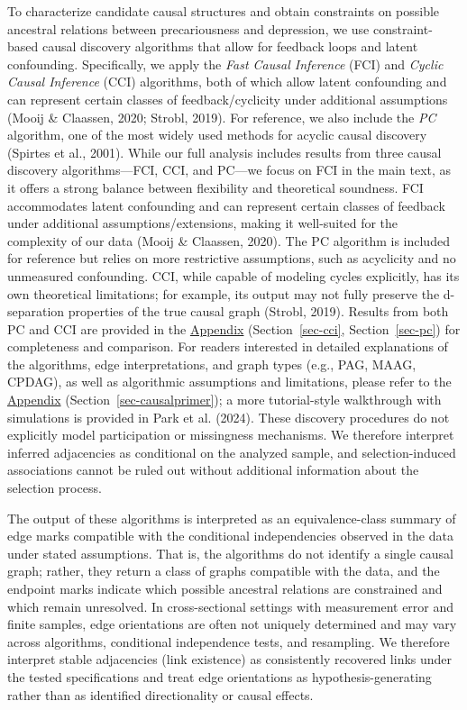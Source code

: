 \documentclass[
]{article}
\begin{document}
\textcolor{BrickRed}{To characterize candidate causal structures and obtain constraints on possible ancestral relations between precariousness and depression, we use constraint-based causal discovery algorithms that allow for feedback loops and latent confounding.}
Specifically, we apply the \emph{Fast Causal Inference} (FCI) and
\emph{Cyclic Causal Inference} (CCI) algorithms,
\textcolor{BrickRed}{both of which allow latent confounding and can represent certain classes of feedback/cyclicity under additional assumptions}
(Mooij \& Claassen, 2020; Strobl, 2019). For reference, we also include
the \emph{PC} algorithm, one of the most widely used methods for acyclic
causal discovery (Spirtes et al., 2001). While our full analysis
includes results from three causal discovery algorithms---FCI, CCI, and
PC---we focus on FCI in the main text, as it offers a strong balance
between flexibility and theoretical soundness.
\textcolor{BrickRed}{FCI accommodates latent confounding and can represent certain classes of feedback under additional assumptions/extensions, making it well-suited for the complexity of our data}
(Mooij \& Claassen, 2020). The PC algorithm is included for reference
but relies on more restrictive assumptions, such as acyclicity and no
unmeasured confounding. CCI, while capable of modeling cycles
explicitly, has its own theoretical limitations; for example, its output
may not fully preserve the d-separation properties of the true causal
graph (Strobl, 2019). Results from both PC and CCI are provided in the
\hyperref[sec-appendix]{Appendix}
(Section~\ref{sec-cci}, Section~\ref{sec-pc}) for completeness and
comparison. For readers interested in detailed explanations of the
algorithms, edge interpretations, and graph types (e.g., PAG, MAAG,
CPDAG), as well as algorithmic assumptions and limitations, please refer
to the \hyperref[sec-appendix]{Appendix}
(Section~\ref{sec-causalprimer})\textcolor{BrickRed}{; a more tutorial-style walkthrough with simulations is provided in}
Park et al. (2024).
\textcolor{BrickRed}{These discovery procedures do not explicitly model participation or missingness mechanisms. We therefore interpret inferred adjacencies as conditional on the analyzed sample, and selection-induced associations cannot be ruled out without additional information about the selection process.}

\textcolor{BrickRed}{The output of these algorithms is interpreted as an equivalence-class summary of edge marks compatible with the conditional independencies observed in the data under stated assumptions. That is, the algorithms do not identify a single causal graph; rather, they return a class of graphs compatible with the data, and the endpoint marks indicate which possible ancestral relations are constrained and which remain unresolved. In cross-sectional settings with measurement error and finite samples, edge orientations are often not uniquely determined and may vary across algorithms, conditional independence tests, and resampling. We therefore interpret stable adjacencies (link existence) as consistently recovered links under the tested specifications and treat edge orientations as hypothesis-generating rather than as identified directionality or causal effects.}
\end{document}
